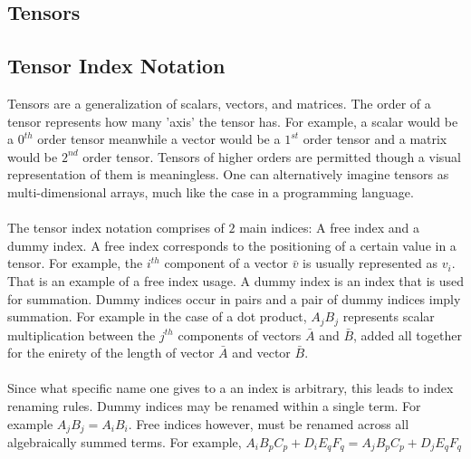 \documentclass[class=report, 12pt, crop=false]{standalone}
\begin{document}
\begin{center}
\chapter{Tensors}
\begin{comment}
\end{comment}
\section{Tensor Index Notation}
\begin{comment}
\end{comment}
Tensors are a generalization of scalars, vectors, and matrices. The order of a tensor represents how many 'axis' the tensor has. For example, a scalar would be a $0^{th}$ order tensor meanwhile a vector would be a $1^{st}$ order tensor and a matrix would be $2^{nd}$ order tensor. Tensors of higher orders are permitted though a visual representation of them is meaningless. One can alternatively imagine tensors as multi-dimensional arrays, much like the case in a programming language.
 \\~\\The tensor index notation comprises of $2$ main indices: A free index and a dummy index. A free index corresponds to the positioning of a certain value in a tensor. For example, the $i^{th}$ component of a vector $\bar{v}$ is usually represented as $v_{i}$. That is an example of a free index usage. A dummy index is an index that is used for summation. Dummy indices occur in pairs and a pair of dummy indices imply summation. For example in the case of a dot product, $A_{j}B_{j}$ represents scalar multiplication between the $j^{th}$ components of vectors $\bar{A}$ and $\bar{B}$, added all together for the enirety of the length of vector $\bar{A}$ and vector $\bar{B}$.
\\~\\Since what specific name one gives to a an index is arbitrary, this leads to index renaming rules. Dummy indices may be renamed within a single term. For example $A_{j}B_{j} = A_{i}B_{i}$. Free indices however, must be renamed across all algebraically summed terms. For example, $A_{i}B_{p}C_{p} + D_{i}E_{q}F_{q} = A_{j}B_{p}C_{p} + D_{j}E_{q}F_{q}$

\end{center}
\end{document}
